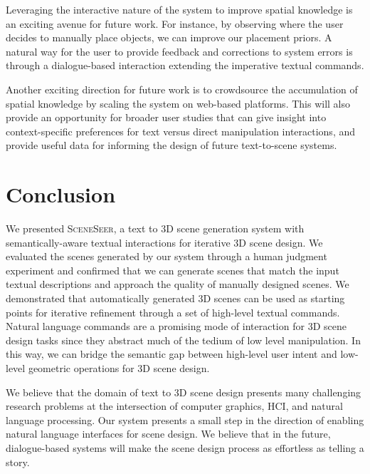 \documentclass{sigchi}
\newcommand{\SceneSeer}{\textsc{SceneSeer}\xspace}
\begin{document}
Leveraging the interactive nature of the system to improve spatial knowledge is an exciting avenue for future work.  For instance, by observing where the user decides to manually place objects, we can improve our placement priors.  A natural way for the user to provide feedback and corrections to system errors is through a dialogue-based interaction extending the imperative textual commands.

Another exciting direction for future work is to crowdsource the accumulation of spatial knowledge by scaling the system on web-based platforms.  This will also provide an opportunity for broader user studies that can give insight into context-specific preferences for text versus direct manipulation interactions, and provide useful data for informing the design of future text-to-scene systems.

\section{Conclusion}

We presented \SceneSeer, a text to 3D scene generation system with semantically-aware textual interactions for iterative 3D scene design.  We evaluated the scenes generated by our system through a human judgment experiment and confirmed that we can generate scenes that match the input textual descriptions and approach the quality of manually designed scenes.  We demonstrated that automatically generated 3D scenes can be used as starting points for iterative refinement through a set of high-level textual commands.  Natural language commands are a promising mode of interaction for 3D scene design tasks since they abstract much of the tedium of low level manipulation.  In this way, we can bridge the semantic gap between high-level user intent and low-level geometric operations for 3D scene design.

We believe that the domain of text to 3D scene design presents many challenging research problems at the intersection of computer graphics, HCI, and natural language processing.  Our system presents a small step in the direction of enabling natural language interfaces for scene design.  We believe that in the future, dialogue-based systems will make the scene design process as effortless as telling a story.



\end{document}
